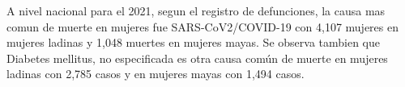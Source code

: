 A nivel nacional para el 2021, segun el registro de defunciones, la causa mas comun de muerte en mujeres fue SARS-CoV2/COVID-19 con 4,107 mujeres en mujeres ladinas y 1,048 muertes en mujeres mayas. Se observa tambien que Diabetes mellitus, no especificada es otra causa común de muerte en mujeres ladinas con 2,785 casos y en mujeres mayas con 1,494 casos. 